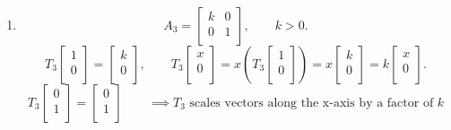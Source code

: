 \documentclass{report}
\begin{document}
{\begin{enumerate}[label=(\roman*)]
\begin{tikzpicture}[line cap=round,line join=round,>=Stealth,
                    every node/.style={inner sep=0pt, font=\small}]
\end{tikzpicture}
\\
 XXX Make green and pink arrow more visible XXX
 \\
			      $ T_2$ fixes the x axis and projects the y-axis orthogonally onto the origin\\
			      $ T_2$ orthogonally projects $ \mathbb{R} ^2$ onto the $ x$-axis.\\
                \item 
			\[
			A_3 = \begin{bmatrix}
			k & 0\\
			0 & 1\\
			\end{bmatrix}  , \qquad k >0
			.\] 
			\[
			T_3 \begin{bmatrix}
			1\\
			0\\
			\end{bmatrix}
			= \begin{bmatrix}
			k\\
			0\\
			\end{bmatrix}
			, \qquad T_3 \begin{bmatrix}
			x\\
			0\\
			\end{bmatrix}       = x \left(  T_3 \begin{bmatrix}
			1\\
			0\\
			\end{bmatrix}
			 \right) 
			    = x \begin{bmatrix}
			    k\\
			    0\\
			    \end{bmatrix}
			    = k \begin{bmatrix}
			    x\\
			    0\\
			    \end{bmatrix}
			.\] 
			\[
			T_3 \begin{bmatrix}
			0\\
			1\\
			\end{bmatrix}
			= \begin{bmatrix}
			0\\
			1\\
			\end{bmatrix}
			\qquad \implies            T_3 \text{ scales vectors along the x-axis by a factor of } k 
\]
\end{enumerate}}
\end{document}
